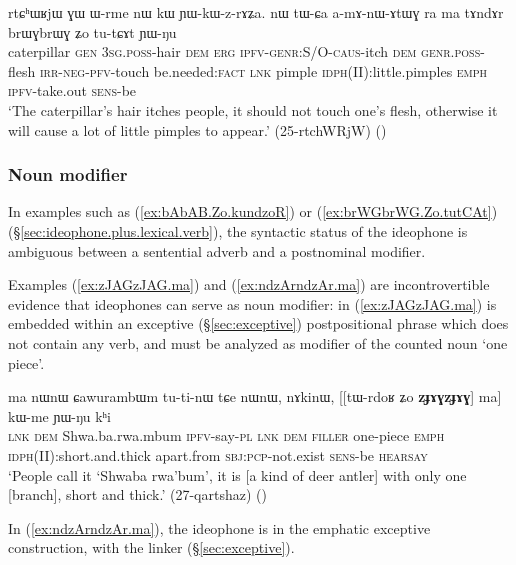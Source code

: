 \begin{exe}
\ex \label{ex:brWGbrWG.Zo.tutCAt}
\gll rtɕʰɯʁjɯ ɣɯ ɯ-rme nɯ kɯ ɲɯ-kɯ-z-rɤʑa. nɯ tɯ-ɕa a-mɤ-nɯ-ɤtɯɣ ra ma tɤndɤr brɯɣbrɯɣ ʑo tu-tɕɤt ɲɯ-ŋu  \\
caterpillar \textsc{gen} \textsc{3sg}.\textsc{poss}-hair \textsc{dem} \textsc{erg} \textsc{ipfv}-\textsc{genr}:S/O-\textsc{caus}-itch \textsc{dem} \textsc{genr}.\textsc{poss}-flesh \textsc{irr}-\textsc{neg}-\textsc{pfv}-touch be.needed:\textsc{fact} \textsc{lnk} pimple \textsc{idph}(II):little.pimples \textsc{emph} \textsc{ipfv}-take.out \textsc{sens}-be \\
\glt `The caterpillar's hair itches people, it should not touch one's flesh, otherwise it will cause a lot of little pimples to appear.' (25-rtchWRjW)
()
\end{exe}
 
  
 \subsubsection{Noun modifier} \label{sec:ideophone.noun.modifier}
 In examples such as (\ref{ex:bAbAB.Zo.kundzoR}) or (\ref{ex:brWGbrWG.Zo.tutCAt}) (§\ref{sec:ideophone.plus.lexical.verb}), the syntactic status of the ideophone is ambiguous between a sentential adverb and a postnominal modifier. 
 
 Examples (\ref{ex:zJAGzJAG.ma}) and (\ref{ex:ndzArndzAr.ma}) are incontrovertible evidence that ideophones can serve as noun modifier: in (\ref{ex:zJAGzJAG.ma}) is embedded within an exceptive (§\ref{sec:exceptive}) postpositional phrase which does not contain any verb, and must be analyzed as modifier of the counted noun  `one piece'.
 
\begin{exe}
\ex \label{ex:zJAGzJAG.ma}
\gll ma nɯnɯ ɕawurambɯm tu-ti-nɯ tɕe nɯnɯ, nɤkinɯ, [[tɯ-rdoʁ ʑo \textbf{zɟɤɣzɟɤɣ}] ma] kɯ-me ɲɯ-ŋu kʰi \\
\textsc{lnk} \textsc{dem} Shwa.ba.rwa.mbum \textsc{ipfv}-say-\textsc{pl} \textsc{lnk} \textsc{dem} \textsc{filler} one-piece \textsc{emph} \textsc{idph}(II):short.and.thick apart.from \textsc{sbj}:\textsc{pcp}-not.exist \textsc{sens}-be \textsc{hearsay} \\
\glt `People call it `Shwaba rwa'bum', it is [a kind of deer antler] with only one [branch], short and thick.'   (27-qartshaz) ()
\end{exe}

In (\ref{ex:ndzArndzAr.ma}), the ideophone  is in the emphatic exceptive construction, with the linker  (§\ref{sec:exceptive}).


